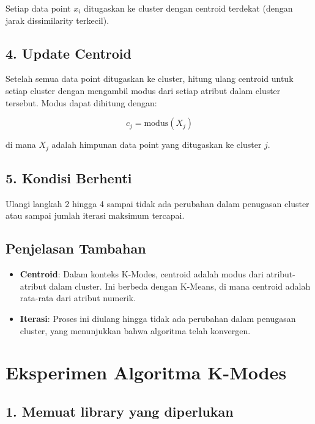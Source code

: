 \documentclass[
  oneside]{book}
\providecommand{\tightlist}{%
  \setlength{\itemsep}{0pt}\setlength{\parskip}{0pt}}
\begin{document}
Setiap data point \(x_i\) ditugaskan ke cluster dengan centroid terdekat (dengan jarak dissimilarity terkecil).

\subsection*{4. Update Centroid}\label{update-centroid}

Setelah semua data point ditugaskan ke cluster, hitung ulang centroid untuk setiap cluster dengan mengambil modus dari setiap atribut dalam cluster tersebut. Modus dapat dihitung dengan:

\[
c_j = \text{modus}(X_j)
\]

di mana \(X_j\) adalah himpunan data point yang ditugaskan ke cluster \(j\).

\subsection*{5. Kondisi Berhenti}\label{kondisi-berhenti}

Ulangi langkah 2 hingga 4 sampai tidak ada perubahan dalam penugasan cluster atau sampai jumlah iterasi maksimum tercapai.

\subsection*{Penjelasan Tambahan}\label{penjelasan-tambahan}

\begin{itemize}
\tightlist
\item
  \textbf{Centroid}: Dalam konteks K-Modes, centroid adalah modus dari atribut-atribut dalam cluster. Ini berbeda dengan K-Means, di mana centroid adalah rata-rata dari atribut numerik.
\item
  \textbf{Iterasi}: Proses ini diulang hingga tidak ada perubahan dalam penugasan cluster, yang menunjukkan bahwa algoritma telah konvergen.
\end{itemize}

\section{Eksperimen Algoritma K-Modes}\label{eksperimen-algoritma-k-modes}

\subsection*{1. Memuat library yang diperlukan}\label{memuat-library-yang-diperlukan-1}
\end{document}
